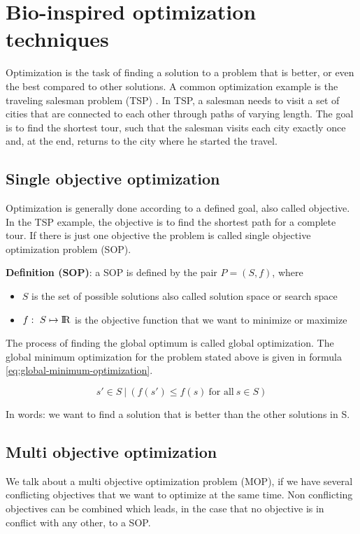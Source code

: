 \chapter{Bio-inspired optimization techniques}
\label{chap:bioalgorithms}

Optimization is the task of finding a solution to a problem that is better, or even the best compared to other solutions. A common optimization example is the traveling salesman problem (TSP) \cite{alexander2005history}. In TSP, a salesman needs to visit a set of cities that are connected to each other through paths of varying length. The goal is to find the shortest tour, such that the salesman visits each city exactly once and, at the end, returns to the city where he started the travel.

\section{Single objective optimization}
Optimization is generally done according to a defined goal, also called objective. In the TSP example, the objective is to find the shortest path for a complete tour. If there is just one objective the problem is called single objective optimization problem (SOP). 

\noindent\textbf{Definition (SOP)}: a SOP is defined by the pair $P=(S,f)$, where
\begin{itemize}
  \item $S$ is the set of possible solutions also called solution space or search space
  \item $f: \ S \mapsto {\rm I\!R}$ is the objective function that we want to minimize or maximize
\end{itemize}
The process of finding the global optimum is called global optimization. The global minimum optimization for the problem stated above is given in formula \eqref{eq:global-minimum-optimization}.

\begin{equation}\label{eq:global-minimum-optimization}
  s' \in S \ | \ (f(s') \leq f(s) \ \mbox{for all} \ s \in S)
\end{equation}

In words: we want to find a solution that is better than the other solutions in S.

\section{Multi objective optimization}
We talk about a multi objective optimization problem (MOP), if we have several conflicting objectives that we want to optimize at the same time. Non conflicting objectives can be combined which leads, in the case that no objective is in conflict with any other, to a SOP.

